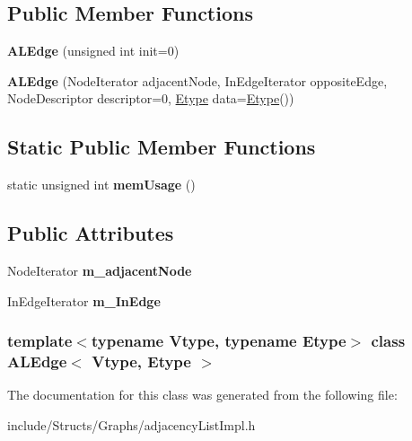 \subsection*{Public Member Functions}
\begin{DoxyCompactItemize}
\item 
\hypertarget{class_a_l_edge_accf665c9e845fec4330f4a05c732c489}{
{\bfseries ALEdge} (unsigned int init=0)}
\label{class_a_l_edge_accf665c9e845fec4330f4a05c732c489}

\item 
\hypertarget{class_a_l_edge_a6196ec88f32c16f4e7d91750461ed569}{
{\bfseries ALEdge} (NodeIterator adjacentNode, InEdgeIterator oppositeEdge, NodeDescriptor descriptor=0, \hyperlink{class_etype}{Etype} data=\hyperlink{class_etype}{Etype}())}
\label{class_a_l_edge_a6196ec88f32c16f4e7d91750461ed569}

\end{DoxyCompactItemize}
\subsection*{Static Public Member Functions}
\begin{DoxyCompactItemize}
\item 
\hypertarget{class_a_l_edge_a11e65a1b0d3df228955835e59cd7bb46}{
static unsigned int {\bfseries memUsage} ()}
\label{class_a_l_edge_a11e65a1b0d3df228955835e59cd7bb46}

\end{DoxyCompactItemize}
\subsection*{Public Attributes}
\begin{DoxyCompactItemize}
\item 
\hypertarget{class_a_l_edge_a91903f050870bd03d7c8077d86cacb1c}{
NodeIterator {\bfseries m\_\-adjacentNode}}
\label{class_a_l_edge_a91903f050870bd03d7c8077d86cacb1c}

\item 
\hypertarget{class_a_l_edge_a17415d47e9e88f35b450d17f701efec8}{
InEdgeIterator {\bfseries m\_\-InEdge}}
\label{class_a_l_edge_a17415d47e9e88f35b450d17f701efec8}

\end{DoxyCompactItemize}
\subsubsection*{template$<$typename Vtype, typename Etype$>$ class ALEdge$<$ Vtype, Etype $>$}



The documentation for this class was generated from the following file:\begin{DoxyCompactItemize}
\item 
include/Structs/Graphs/adjacencyListImpl.h\end{DoxyCompactItemize}
